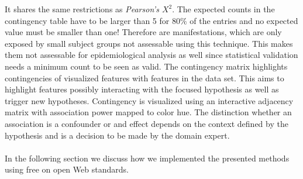 \documentclass[journal]{style/vgtc} 			          %
\begin{document}
It shares the same restrictions as \emph{Pearson's $X^2$}.
%
The expected counts in the contingency table have to be larger than 5 for $80\%$ of the entries and no expected value must be smaller than one!
%
Therefore are manifestations, which are only exposed by small subject groups not assessable using this technique.
%
This makes them not assessable for epidemiological analysis as well since statistical validation needs a minimum count to be seen as valid.
The contingency matrix highlights contingencies of visualized features with features in the data set.
%
This aims to highlight features possibly interacting with the focused hypothesis as well as trigger new hypotheses.
%
Contingency is visualized using an interactive adjacency matrix with association power mapped to color hue.
%
The distinction whether an association is a confounder or and effect depends on the context defined by the hypothesis and is a decision to be made by the domain expert.
\\\\
In the following section we discuss how we implemented the presented methods using free on open Web standards.
% 
\end{document}
